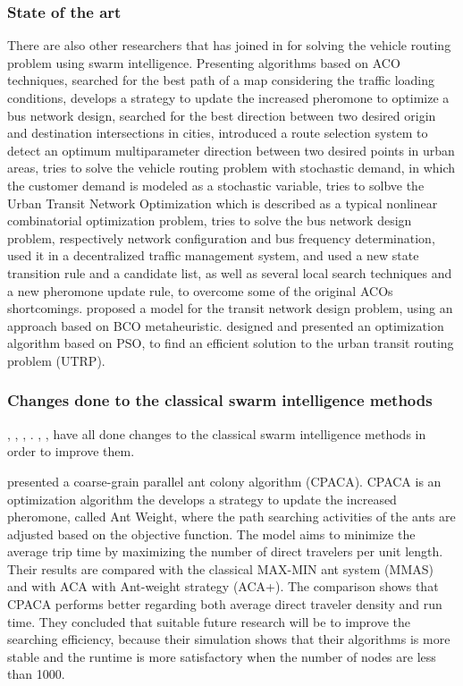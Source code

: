 \subsubsection{State of the art}
There are also other researchers that has joined in for solving the vehicle routing problem using swarm intelligence. 
Presenting algorithms based on ACO techniques, \citet{hsiao04} searched for the best path of a map considering the traffic loading conditions, \citet{yang07} develops a strategy to update the increased pheromone to optimize a bus network design, \citet{salehi-nezhad07} searched for the best direction between two desired origin and destination intersections in cities, \citet{salehinejad10} introduced a route selection system to detect an optimum multiparameter direction between two desired points in urban areas, \citet{tripathi09} tries to solve the vehicle routing problem with stochastic demand, in which the customer demand is modeled as a stochastic variable, \citet{jiang10} tries to solbve the Urban Transit Network Optimization which is described as a typical nonlinear combinatorial optimization problem, \citet{poorzahedy11} tries to solve the bus network design problem, respectively network configuration and bus frequency determination, \citet{dias14} used it in a decentralized traffic management system, and \citet{sedighpour14} used a new state transition rule and a candidate list, as well as several local search techniques and a new pheromone update rule, to overcome some of the original ACOs shortcomings.  \citet{nikolic14} proposed a model for the transit network design problem, using an approach based on BCO metaheuristic. \citet{kechagiopoulos14} designed and presented an optimization algorithm based on PSO, to find an efficient solution to the urban transit routing problem (UTRP). 

\subsubsection{Changes done to the classical swarm intelligence methods}
\citet{yang07}, \citet{salehi-nezhad07}, \citet{tripathi09}, \citet{salehinejad10}. \citet{jiang10}, \citet{dias14}, \citet{sedighpour14} have all done changes to the classical swarm intelligence methods in order to improve them.
 
\citet{yang07} presented a coarse-grain parallel ant colony algorithm (CPACA). CPACA is an optimization algorithm the develops a strategy to update the increased pheromone, called Ant Weight, where the path searching activities of the ants are adjusted based on the objective function. The model aims to minimize the average trip time by maximizing the number of direct travelers per unit length. Their results are compared with the classical MAX-MIN ant system (MMAS)\citep{stutzle99} and with ACA with Ant-weight strategy (ACA+). The comparison shows that CPACA performs better regarding both average direct traveler density and run time. They concluded that suitable future research will be to improve the searching efficiency, because their simulation shows that their algorithms is more stable and the runtime is more satisfactory when the number of nodes are less than 1000. 

